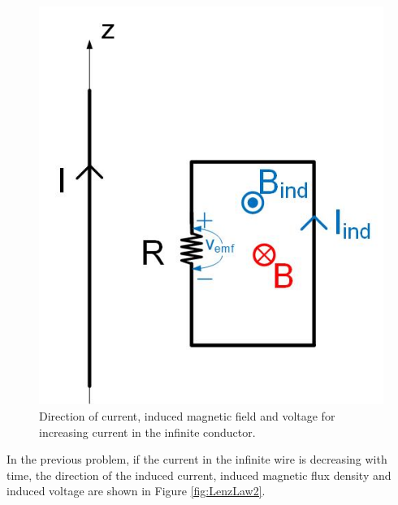 \documentclass{ximera}
\begin{document}
\begin{example}
\begin{explanation}
\begin{figure}[htbp]
\begin{center}
\includegraphics[scale=0.5]{../jpg/Lenzlaw3.jpg}
\end{center}
\caption{Direction of current, induced magnetic field and voltage for increasing current in the infinite conductor.}
\label{fig:LenzLaw3}
\end{figure}





\end{explanation}


\begin{example}

In the previous problem, if the current in the infinite wire is decreasing with time, the direction of the induced current, induced magnetic flux density and induced voltage are shown in Figure \ref{fig:LenzLaw2}.




\end{example}
\end{example}
\end{document}
